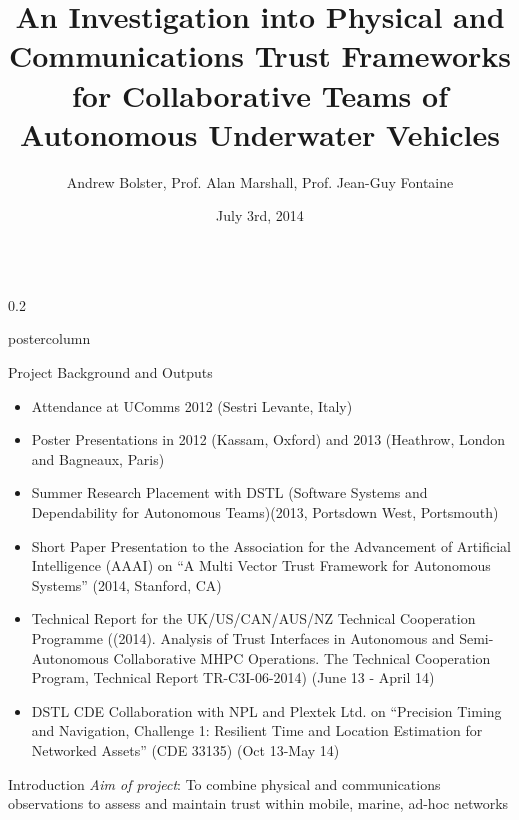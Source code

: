 \documentclass[final,hyperref={pdfpagelabels=false}]{beamer}
\title{\huge An Investigation into Physical and Communications Trust Frameworks \\
for Collaborative Teams of Autonomous Underwater Vehicles}
\author{Andrew Bolster, Prof. Alan Marshall, Prof. Jean-Guy Fontaine }
\institute[UoL]{Advanced Networks Research Group, University of Liverpool, UK}
\date[03/07/14]{July 3rd, 2014}
\def\colwidth{0.2\linewidth}
\begin{document}
\begin{frame}[fragile]
	\begin{columns}[T]
		\begin{column}{\colwidth}
			\begin{beamercolorbox}[center,wd=\textwidth]{postercolumn}
				\begin{minipage}[T]{.98\textwidth}  %
					\parbox[t]{\textwidth}{ %
						\begin{block}{Project Background and Outputs}
							\begin{itemize}
								\item Attendance at UComms 2012 (Sestri Levante, Italy)
								\item Poster Presentations in 2012 (Kassam, Oxford) and 2013 (Heathrow, London and Bagneaux, Paris)
								\item Summer Research Placement with DSTL (Software Systems and Dependability for Autonomous Teams)(2013, Portsdown West, Portsmouth)
								\item Short Paper Presentation to the Association for the Advancement of Artificial Intelligence (AAAI) on ``A Multi Vector Trust Framework for Autonomous Systems'' (2014, Stanford, CA)\cite{Bolster2014}
								\item Technical Report for the UK/US/CAN/AUS/NZ Technical Cooperation Programme ((2014). Analysis of Trust Interfaces in Autonomous and Semi-Autonomous Collaborative MHPC Operations. The Technical Cooperation Program, Technical Report TR-C3I-06-2014) (June 13 - April 14)\cite{Bolster2014a}
								\item DSTL CDE Collaboration with NPL and Plextek Ltd. on ``Precision Timing and Navigation, Challenge 1: Resilient Time and Location Estimation for Networked Assets'' (CDE 33135) (Oct 13-May 14)
							\end{itemize}
						\end{block}
						
						\begin{block}{Introduction}
							\emph{Aim of project}: To combine physical and communications observations to assess and maintain trust within mobile, marine, ad-hoc networks
							

\end{block}}
\end{minipage}
\end{beamercolorbox}
\end{column}
\end{columns}
\end{frame}
\end{document}
